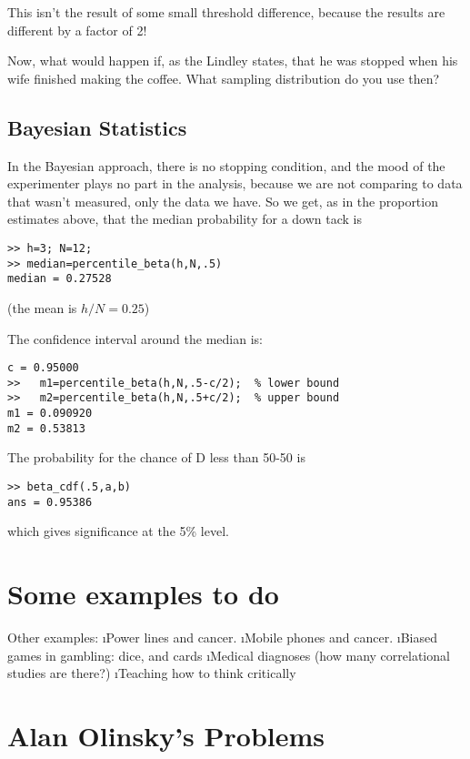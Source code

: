 This isn't the result of some small threshold difference, because the results
are different by a factor of 2!

Now, what would happen if, as the Lindley states, that he was stopped when his
wife finished making the coffee.  What sampling distribution do you use then?

\subsection{Bayesian Statistics}

In the Bayesian approach, there is no stopping condition, and the mood of the
experimenter plays no part in the analysis, because we are not comparing to
data that wasn't measured, only the data we have.  So we get, as in the
proportion estimates above, that the median probability for a down tack is
\begin{verbatim}
>> h=3; N=12; 
>> median=percentile_beta(h,N,.5)
median = 0.27528
\end{verbatim}
(the mean is $h/N=0.25$)

The confidence interval around the median is:

\begin{verbatim}
c = 0.95000
>>   m1=percentile_beta(h,N,.5-c/2);  % lower bound
>>   m2=percentile_beta(h,N,.5+c/2);  % upper bound
m1 = 0.090920
m2 = 0.53813
\end{verbatim}

The probability for the chance of D less than 50-50 is
\begin{verbatim}
>> beta_cdf(.5,a,b)
ans = 0.95386
\end{verbatim}

which gives significance at the 5\% level.

\section{Some examples to do}



Other examples:
\bi
\i Power lines and cancer. 
\i Mobile phones and cancer.
\i Biased games in gambling: dice, and cards
\i Medical diagnoses (how many correlational studies are there?)
\i Teaching how to think critically
\ei


\section{Alan Olinsky's Problems}

